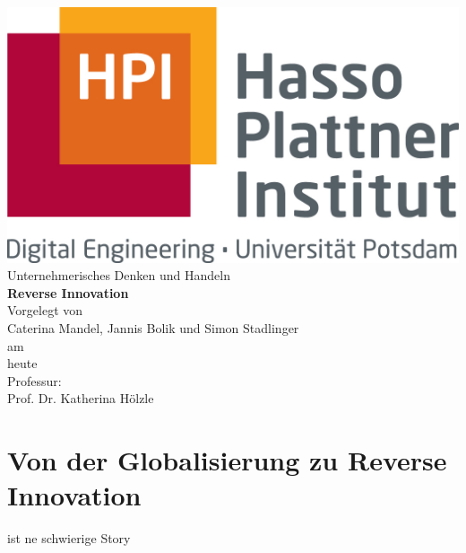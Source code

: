 \documentclass[a4paper,11pt]{scrartcl}
\author{Simon  Stadlinger}
\begin{document}
	\begin{titlepage}
		\centering
		\includegraphics[scale=.6]{hpi_logo.jpg}\\\vspace{2cm}
		{\Large Unternehmerisches Denken und Handeln}\\\vspace{2cm}
		{\Huge \textbf{Reverse Innovation}}\\\vspace{2cm}
		{\large Vorgelegt von}\\\vspace{.5cm}
		{\Large Caterina Mandel, Jannis Bolik und Simon Stadlinger  }\\\vspace{.5cm}
		{\large am}\\\vspace{.5cm}
		{\Large heute }\\\vspace{5cm}
		{\large Professur:}\\\vspace{.5cm}
		{\Large Prof. Dr. Katherina Hölzle}
		
		
	\end{titlepage}
\newpage
\thispagestyle{empty}
\section*{}
\newpage
\pagestyle{fancy}



\tableofcontents\newpage
\section{Von der Globalisierung zu Reverse Innovation}
ist ne schwierige Story
\end{document}
